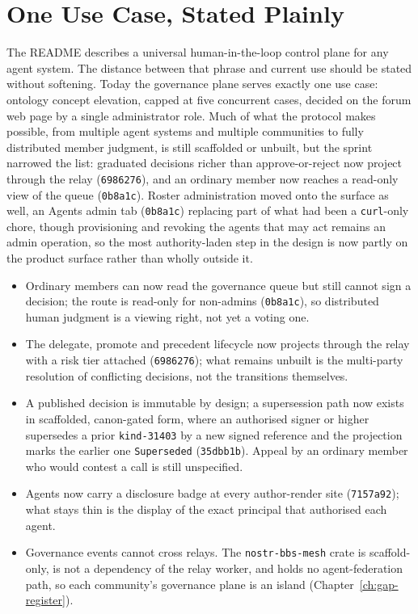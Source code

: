 \section{One Use Case, Stated Plainly}

The README describes a universal human-in-the-loop control plane for any agent system. The distance between that phrase and current use should be stated without softening. Today the governance plane serves exactly one use case: ontology concept elevation, capped at five concurrent cases, decided on the forum web page by a single administrator role. Much of what the protocol makes possible, from multiple agent systems and multiple communities to fully distributed member judgment, is still scaffolded or unbuilt, but the sprint narrowed the list: graduated decisions richer than approve-or-reject now project through the relay (\texttt{6986276}), and an ordinary member now reaches a read-only view of the queue (\texttt{0b8a1c}). Roster administration moved onto the surface as well, an Agents admin tab (\texttt{0b8a1c}) replacing part of what had been a \texttt{curl}-only chore, though provisioning and revoking the agents that may act remains an admin operation, so the most authority-laden step in the design is now partly on the product surface rather than wholly outside it.

\begin{cautionbox}[title={What the governance plane does and does not yet do}]
\begin{itemize}
  \item Ordinary members can now read the governance queue but still cannot sign a decision; the route is read-only for non-admins (\texttt{0b8a1c}), so distributed human judgment is a viewing right, not yet a voting one.
  \item The delegate, promote and precedent lifecycle now projects through the relay with a risk tier attached (\texttt{6986276}); what remains unbuilt is the multi-party resolution of conflicting decisions, not the transitions themselves.
  \item A published decision is immutable by design; a supersession path now exists in scaffolded, canon-gated form, where an authorised signer or higher supersedes a prior \texttt{kind-31403} by a new signed reference and the projection marks the earlier one \texttt{Superseded} (\texttt{35dbb1b}). Appeal by an ordinary member who would contest a call is still unspecified.
  \item Agents now carry a disclosure badge at every author-render site (\texttt{7157a92}); what stays thin is the display of the exact principal that authorised each agent.
  \item Governance events cannot cross relays. The \texttt{nostr-bbs-mesh} crate is scaffold-only, is not a dependency of the relay worker, and holds no agent-federation path, so each community's governance plane is an island (Chapter~\ref{ch:gap-register}).
\end{itemize}
\end{cautionbox}


